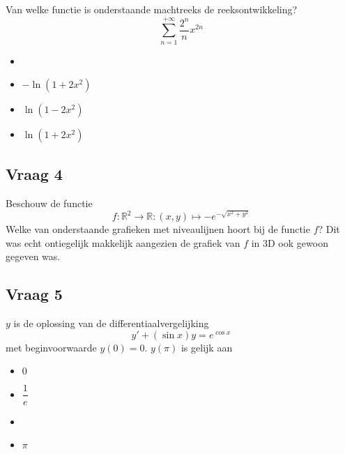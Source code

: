 \documentclass[kulak]{kulakarticle} %
\newcommand{\R}{\mathbb{R}}
\renewcommand{\boxed}[1]{\text{\fboxsep=.3em\fbox{#1}}}
\begin{document}
	Van welke functie is onderstaande machtreeks de reeksontwikkeling? \[ \sum_{n=1}^{+\infty}\frac{2^n}{n}x^{2n} \]

	\begin{itemize}
		\item \boxed{\( -\ln{(1-2x^2)} \)}
		\item \( -\ln{(1+2x^2)} \)
		\item \( \ln{(1-2x^2)} \)
		\item \( \ln{(1+2x^2)} \)
	\end{itemize}

	\subsection*{Vraag 4}

	Beschouw de functie \[ f : \R^2 \to \R : (x,y) \mapsto -e^{-\sqrt{x^2+y^2}} \]
	Welke van onderstaande grafieken met niveaulijnen hoort bij de functie \(f\)? Dit was echt ontiegelijk makkelijk aangezien de grafiek van \(f\) in 3D ook gewoon gegeven was.

	\subsection*{Vraag 5}

	\(y\) is de oplossing van de differentiaalvergelijking \[ y' + (\sin{x})y = e^{\cos{x}} \] met beginvoorwaarde \(y(0)=0\). \(y(\pi)\) is gelijk aan
	\begin{itemize}
		\item \(0\)
		\item \(\dfrac{1}{e}\)
		\item \boxed{\(\dfrac{\pi}{e}\)}
		\item \(\pi\)
	\end{itemize}
\end{document}
